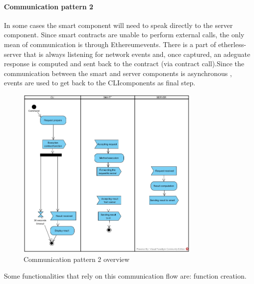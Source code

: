 \paragraph{Communication pattern 2}
In some cases the smart component will need to speak directly to the server component. Since smart contracts are unable to perform external calls, the only mean of communication is through Ethereum\glo events. There is a part of etherless-server that is always listening for network events and, once captured, an adeguate response is computed and sent back to the contract (via contract call).\newline Since the communication between the smart and server components is asynchronous , events are used to get back to the CLI\glo components as final step.
\begin{figure}[H]
	\centering
	\includegraphics[width=0.8\textwidth]{res/img/pattern1.jpg}
	\caption{Communication pattern 2 overview}
\end{figure}
\noindent Some functionalities that rely on this communication flow are: function creation.
\newpage
